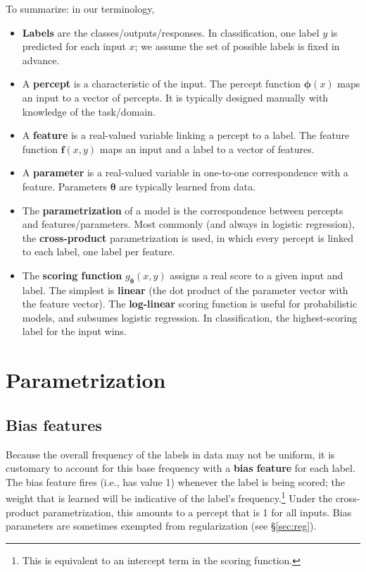 \documentclass[11pt,letterpaper]{article}
\newcommand{\Sref}[1]{\S\ref{#1}}
\begin{document}
\noindent To summarize: in our terminology,
\begin{itemize}
  \item {\bf Labels} are the classes/outputs/responses. In classification, one label $y$ is predicted for each input $x$; 
  we assume the set of possible labels is fixed in advance.
  \item A {\bf percept} is a characteristic of the input. The percept function $\boldsymbol{\phi}(x)$ maps an input to a vector of percepts.
  It is typically designed manually with knowledge of the task/domain.
  \item A {\bf feature} is a real-valued variable linking a percept to a label. The feature function $\mathbf{f}(x,y)$ maps an input and a label to a vector of features.
  \item A {\bf parameter} is a real-valued variable in one-to-one correspondence with a feature. Parameters $\boldsymbol{\theta}$ are typically learned from data.
  \item The {\bf parametrization} of a model is the correspondence between percepts and features/parameters. 
  Most commonly (and always in logistic regression), the {\bf cross-product} parametrization is used, in which every percept is linked to each label, one label per feature.
  \item The {\bf scoring function} $g_{\boldsymbol{\theta}}(x,y)$ assigns a real score to a given input and label. 
  The simplest is {\bf linear} (the dot product of the parameter vector with the feature vector).
  The {\bf log-linear} scoring function is useful for probabilistic models, and subsumes logistic regression.
  In classification, the highest-scoring label for the input wins. 
\end{itemize}

\section{Parametrization}\label{sec:param}

\subsection{Bias features}\label{sec:bias}

Because the overall frequency of the labels in data may not be uniform, 
it is customary to account for this base frequency with a {\bf bias feature} 
for each label. The bias feature fires (i.e., has value 1) whenever 
the label is being scored; the weight that is learned will be indicative of 
the label's frequency.\footnote{This is equivalent to an intercept term in the scoring function.} 
Under the cross-product parametrization, this amounts to a percept that is 1 for all inputs.
Bias parameters are sometimes exempted from regularization (see \Sref{sec:reg}).
\end{document}
